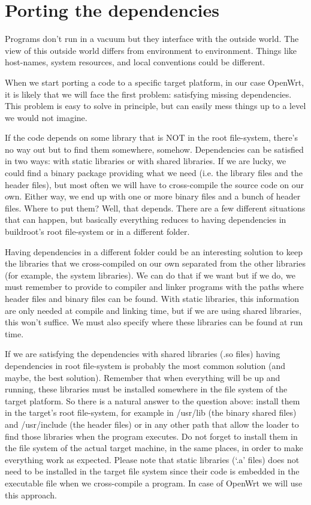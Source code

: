\chapter{Porting the dependencies}\label{satisfy_dependencies}

Programs don’t run in a vacuum but they interface with the outside world.
The view of this outside world differs from environment to environment.
Things like host-names, system resources, and local conventions could be different.

When we start porting a code to a specific target platform, in our case OpenWrt, it is likely that we will face the first problem: satisfying missing dependencies.
This problem is easy to solve in principle, but can easily mess things up to a level we would not imagine.

If the code depends on some library that is NOT in the root file-system, there’s no way out but to find them somewhere, somehow.
Dependencies can be satisfied in two ways: with static libraries or with shared libraries.
If we are lucky, we could find a binary package providing what we need (i.e. the library files and the header files), but most often we will have to cross-compile the source code on our own.
Either way, we end up with one or more binary files and a bunch of header files.
Where to put them? Well, that depends.
There are a few different situations that can happen, but basically everything reduces to having dependencies in buildroot's root file-system or in a different folder.

Having dependencies in a different folder could be an interesting solution to keep the libraries that we cross-compiled on our own separated from the other libraries (for example, the system libraries).
We can do that if we want but if we do, we must remember to provide to compiler and linker programs with the paths where header files and binary files can be found.
With static libraries, this information are only needed at compile and linking time, but if we are using shared libraries, this won’t suffice.
We must also specify where these libraries can be found at run time.

If we are satisfying the dependencies with shared libraries (.so files) having dependencies in root file-system is probably the most common solution (and maybe, the best solution).
Remember that when everything will be up and running, these libraries must be installed somewhere in the file system of the target platform.
So there is a natural answer to the question above: install them in the target's root file-system, for example in /usr/lib (the binary shared files) and /usr/include (the header files) or in any other path that allow the loader to find those libraries when the program executes.
Do not forget to install them in the file system of the actual target machine, in the same places, in order to make everything work as expected.
Please note that static libraries (‘.a’ files) does not need to be installed in the target file system since their code is embedded in the executable file when we cross-compile a program.
In case of OpenWrt we will use this approach\cite{fabrizio}.



